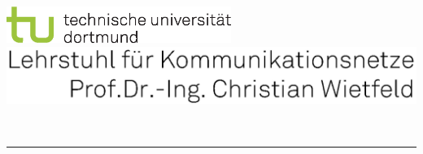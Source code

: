 \begin{titlepage}
\begin{addmargin}[-1cm]{-3cm}
		\includegraphics*[width=7.3cm]{gfx/tu_rgb}
		\includegraphics*[scale = 0.57]{gfx/LSKN}
\begin{minipage}[b]{17cm}
	\vspace{1.2cm}%
\end{minipage}
		~
	\vspace{0.5cm}

	\hrule
\begin{center}
	{\normalsize{}\fontsize{14}{14}\selectfont 
		{\normalsize\fontsize{14}{14}\selectfont 
			
			\vspace{2.8cm}%
			
			{\large \textbf{\myDocType}}

			\vspace{4.5cm}%

			\parbox{\textwidth}{%
				\begin{center}
					\LARGE\textbf{%
						\myTitle
						}
				\end{center}
			}

			\vspace{5cm}%

			{\fontsize{13pt}{12} \selectfont%
				\textbf{\myDegree \myName}
			}\\
			\vspace{3cm}

}}
\end{center}
\end{addmargin}
\end{titlepage}
